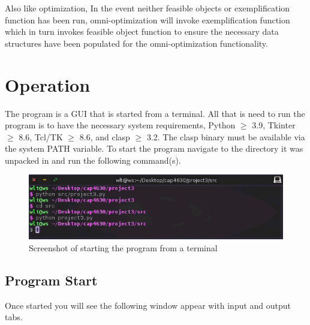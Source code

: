 \documentclass[12pt]{report}
\begin{document}
Also like optimization, In the event neither feasible objects or exemplification function has been run, omni-optimization will invoke exemplification function which in turn invokes feasible object function to ensure the necessary data structures have been populated for the omni-optimization functionality. 

\newpage
\section{Operation}
The program is a GUI that is started from a terminal. All that is need to run the program is to have the necessary system requirements, Python $\geq$ 3.9, Tkinter $\geq$ 8.6, Tcl/TK $\geq$ 8.6, and clasp $\geq$ 3.2. The clasp binary must be available via the system PATH variable. To start the program navigate to the directory it was unpacked in and run the following command(s).

\begin{figure}[H]
\begin{center}
\includegraphics[scale=0.5]{start_program}
\caption{Screenshot of starting the program from a terminal}
\end{center}
\end{figure}

\subsection{Program Start}
Once started you will see the following window appear with input and output tabs.
\end{document}
